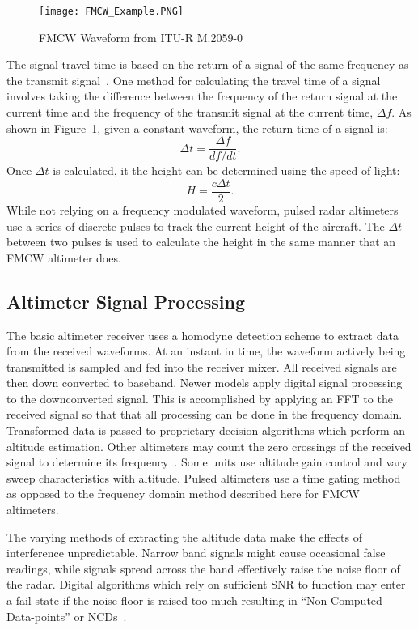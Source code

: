 \begin{figure}
 \centering
 \texttt{[image: FMCW\_Example.PNG]}
 \caption{FMCW Waveform from ITU-R M.2059-0 ~\cite{noauthor_operational_2014}}
 \label{fig:FMCW}
\end{figure}
The signal travel time is based on the return of a signal of the same frequency as the transmit signal~\cite{noauthor_operational_2014}. One method for calculating the travel time of a signal involves taking the difference between the frequency of the return signal at the current time and the frequency of the transmit signal at the current time, $\Delta f$. As shown in Figure~\ref{fig:FMCW}, given a constant waveform, the return time of a signal is:
\begin{equation*}
\Delta t = \frac{\Delta f}{df/dt} .
\end{equation*}
Once $\Delta t$ is calculated, it the height can be determined using the speed of light: 
\begin{equation*}
H = \frac{c\Delta t}{2} .
\end{equation*}
While not relying on a frequency modulated waveform, pulsed radar altimeters use a series of discrete pulses to track the current height of the aircraft. The $\Delta t$ between two pulses is used to calculate the height in the same manner that an FMCW altimeter does. 

\subsection{Altimeter Signal Processing}
The basic altimeter receiver uses a homodyne detection scheme to extract data from the received waveforms. At an instant in time, the waveform actively being transmitted is sampled and fed into the receiver mixer. All received signals are then down converted to baseband. Newer models apply digital signal processing to the downconverted signal. This is accomplished by applying an FFT to the received signal so that that all processing can be done in the frequency domain. Transformed data is passed to proprietary decision algorithms which perform an altitude estimation. Other altimeters may count the zero crossings of the received signal to determine its frequency~\cite{noauthor_operational_2014}. Some units use altitude gain control and vary sweep characteristics with altitude. Pulsed altimeters use a time gating method as opposed to the frequency domain method described here for FMCW altimeters. 

The varying methods of extracting the altitude data make the effects of interference unpredictable. Narrow band signals might cause occasional false readings, while signals spread across the band effectively raise the noise floor of the radar. Digital algorithms which rely on sufficient SNR to function may enter a fail state if the noise floor is raised too much resulting in ``Non Computed Data-points'' or NCDs~\cite{noauthor_operational_2014}.


